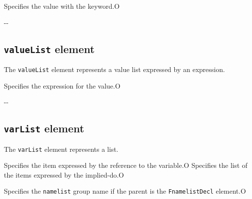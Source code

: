 \begin{XcodeMLChildElements}
{Specifies the value with the keyword.}{O}
\end{XcodeMLChildElements}

\begin{XcodeMLAttributes}
\XcodeMLAttrDef{-}{-}
{-}{-}
\end{XcodeMLAttributes}


\subsection{ {\tt valueList} element}

The {\tt valueList} element represents a value list expressed by an expression.


\begin{XcodeMLChildElements}
{Specifies the expression for the value.}{O}
\end{XcodeMLChildElements}

\begin{XcodeMLAttributes}
\XcodeMLAttrDef{-}{-}
{-}{-}
\end{XcodeMLAttributes}


\subsection{ {\tt varList} element}

The {\tt varList} element represents a list.


\begin{XcodeMLChildElements}
{Specifies the item expressed by the reference to the variable.}{O}
{Specifies the list of the items expressed by the implied-do.}{O}
\end{XcodeMLChildElements}

\begin{XcodeMLAttributes}
{Specifies the {\tt namelist} group name if the parent is the {\tt FnamelistDecl} element.}{O}
\end{XcodeMLAttributes}

